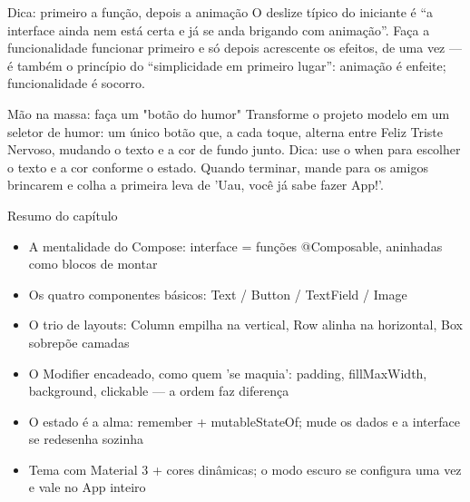 \begin{tcbinfo}{Dica: primeiro a função, depois a animação}
O deslize típico do iniciante é “a interface ainda nem está certa e já se anda brigando com animação”. Faça a funcionalidade funcionar primeiro e só depois acrescente os efeitos, de uma vez — é também o princípio do “simplicidade em primeiro lugar”: animação é enfeite; funcionalidade é socorro.

\end{tcbinfo}

\begin{tcbpractice}{Mão na massa: faça um "botão do humor"}
Transforme o projeto modelo em um seletor de humor: um único botão que, a cada toque, alterna entre Feliz Triste Nervoso, mudando o texto e a cor de fundo junto. Dica: use o when para escolher o texto e a cor conforme o estado. Quando terminar, mande para os amigos brincarem e colha a primeira leva de 'Uau, você já sabe fazer App!'.

\end{tcbpractice}

\begin{tcbsummary}{Resumo do capítulo}
\begin{itemize}
  \item A mentalidade do Compose: interface = funções @Composable, aninhadas como blocos de montar
  \item Os quatro componentes básicos: Text / Button / TextField / Image
  \item O trio de layouts: Column empilha na vertical, Row alinha na horizontal, Box sobrepõe camadas
  \item O Modifier encadeado, como quem 'se maquia': padding, fillMaxWidth, background, clickable — a ordem faz diferença
  \item O estado é a alma: remember + mutableStateOf; mude os dados e a interface se redesenha sozinha
  \item Tema com Material 3 + cores dinâmicas; o modo escuro se configura uma vez e vale no App inteiro
\end{itemize}

\end{tcbsummary}

